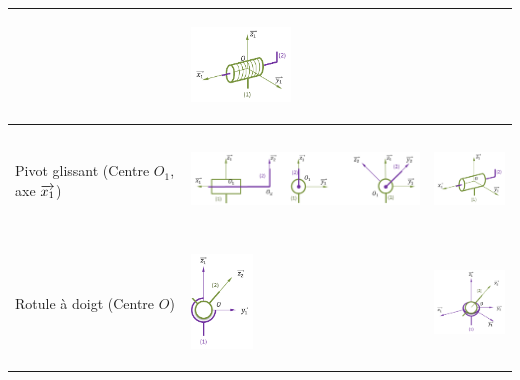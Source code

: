 \documentclass[10pt,oneside]{article}
\begin{document}
\begin{center}
\begin{tabular}{|m{}|p{}|p{}|}
\begin{center}
\end{center}
&
\begin{center}
\includegraphics[height=2cm]{png/helico_3d}
\end{center}\\
\hline
Pivot glissant
(Centre $O_1$, axe $\overrightarrow{x_1}$)
&
\begin{center}
\includegraphics[height=2cm]{png/pivotg_2d}
\end{center}
&
\begin{center}
\includegraphics[height=2cm]{png/pivotg_3d}
\end{center}\\
\hline
Rotule à doigt
(Centre $O$)
&
\begin{center}
\includegraphics[height=2.5cm]{png/doigt_2d}
\end{center}
&
\begin{center}
\includegraphics[height=2cm]{png/doigt_3d}
\end{center}\\
\hline
\end{tabular}
\end{center}
\end{document}
